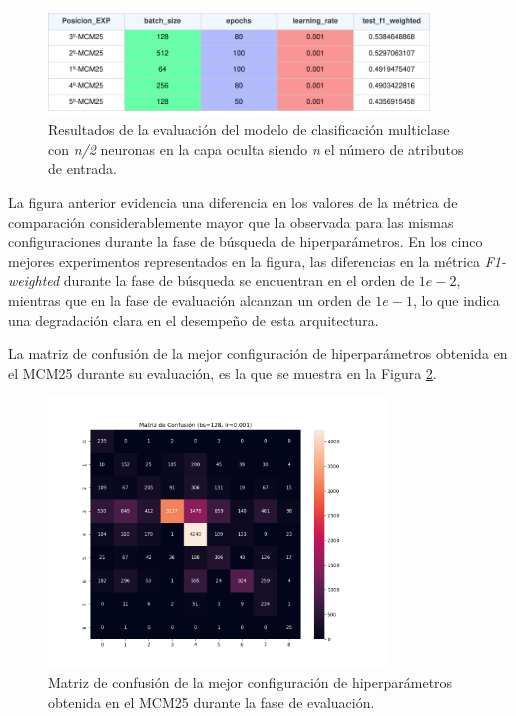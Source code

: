 \begin{figure}[H]
    \centering
    \includegraphics[width=0.9\textwidth]{./img/evaluacion/resultados/EVALMCM25.pdf}
    \caption{Resultados de la evaluación del modelo de clasificación multiclase con \textit{n/2} neuronas en la capa oculta siendo \textit{n} el número de atributos de entrada.}
    \label{fig:EVALMCM25}
\end{figure}

La figura anterior evidencia una diferencia en los valores de la métrica de comparación considerablemente mayor que la observada para las mismas configuraciones durante la fase de búsqueda de hiperparámetros. En los cinco mejores experimentos representados en la figura, las diferencias en la métrica \textit{F1-weighted} durante la fase de búsqueda se encuentran en el orden de $1e-2$, mientras que en la fase de evaluación alcanzan un orden de $1e-1$, lo que indica una degradación clara en el desempeño de esta arquitectura. 


La matriz de confusión de la mejor configuración de hiperparámetros obtenida en el MCM25 durante su evaluación, es la que se muestra en la Figura \ref{fig:MC_EVAL_MCM25}.

\begin{figure}[H]
    \centering
    \includegraphics[width=0.8\textwidth]{./img/evaluacion/matrices_confusion/MC_EVAL_MCM25.png}
    \caption{Matriz de confusión de la mejor configuración de hiperparámetros obtenida en el MCM25 durante la fase de evaluación.}
    \label{fig:MC_EVAL_MCM25}
\end{figure}

